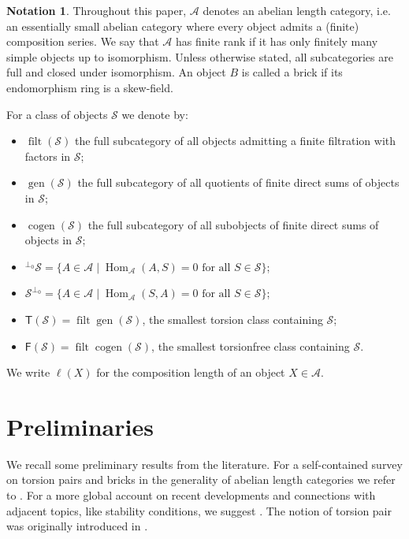\documentclass[11pt]{amsart}
\theoremstyle{definition}
\newtheorem{notation}[theorem]{Notation}
\newcommand{\A}{\mathcal A}
\newcommand{\T}{\mathsf T}
\newcommand{\F}{\mathsf F}
\newcommand{\filt}{\operatorname{filt}}
\newcommand{\gen}{\operatorname{gen}}
\newcommand{\cogen}{\operatorname{cogen}}
\newcommand{\Hom}{\operatorname{Hom}}
\newcommand{\elll}{\ell}
\newcommand{\lperpzero}{{{}^{\perp_0}}}
\begin{document}
\begin{notation}\label{not:standing}
Throughout this paper, \(\A\) denotes an abelian length category, i.e. an essentially small abelian category where every object admits a (finite) composition series. We say that \(\A\) has finite rank if it has only finitely many simple objects up to isomorphism. Unless otherwise stated, all subcategories are full and closed under isomorphism.
An object \( B \) is called a brick if its endomorphism ring is a skew-field.

For a class of objects \(\mathcal S\) we denote by:
\begin{itemize}[leftmargin=2.5em]
\item \(\filt(\mathcal S)\) the full subcategory of all objects admitting a finite filtration with factors in \(\mathcal S\);
\item \(\gen(\mathcal S)\) the full subcategory of all quotients of finite direct sums of objects in \(\mathcal S\);
\item \(\cogen(\mathcal S)\) the full subcategory of all subobjects of finite direct sums of objects in \(\mathcal S\);
\item \(\lperpzero\mathcal S=\{A\in\A\mid \Hom_\A(A,S)=0\text{ for all }S\in\mathcal S\}\);
\item \(\mathcal S^{\perp_0}=\{A\in\A\mid \Hom_\A(S,A)=0\text{ for all }S\in\mathcal S\}\);
\item \(\T(\mathcal S)=\filt\gen(\mathcal S)\), the smallest torsion class containing \(\mathcal S\);
\item \(\F(\mathcal S)=\filt\cogen(\mathcal S)\), the smallest torsionfree class containing \(\mathcal S\).
\end{itemize}
We write \(\elll(X)\) for the composition length of an object \(X\in\A\).
\end{notation}

\section{Preliminaries}

We recall some preliminary results from the literature. For a self-contained survey on torsion pairs and bricks in the generality of abelian length categories we refer to \cite{RingelBrickChain}. For a more global account on recent developments and connections with adjacent topics, like stability conditions, we suggest \cite{MousavandPaquetteSurvey}. The notion of torsion pair was originally introduced in \cite{Dickson}.
\end{document}
